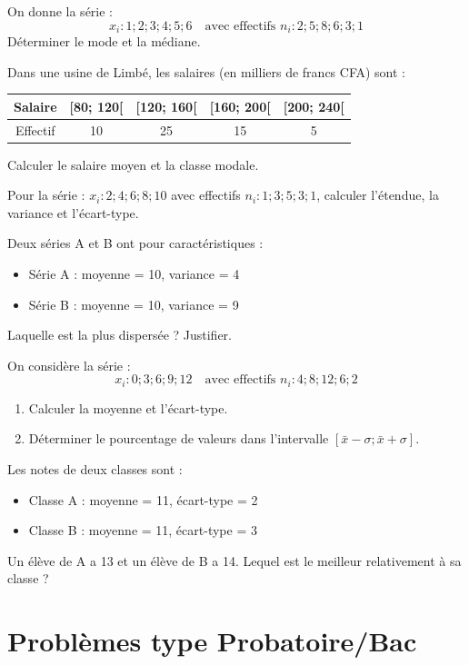 \exo{}
On donne la série :
\[
x_i : 1; 2; 3; 4; 5; 6 \quad \text{avec effectifs } n_i : 2; 5; 8; 6; 3; 1
\]
Déterminer le mode et la médiane.

\exo{}
Dans une usine de Limbé, les salaires (en milliers de francs CFA) sont :
\begin{center}
\begin{tabular}{|c|c|c|c|c|}
\hline
Salaire & [80; 120[ & [120; 160[ & [160; 200[ & [200; 240[ \\
\hline
Effectif & 10 & 25 & 15 & 5 \\
\hline
\end{tabular}
\end{center}
Calculer le salaire moyen et la classe modale.


\exo{}
Pour la série : \(x_i : 2; 4; 6; 8; 10\) avec effectifs \(n_i : 1; 3; 5; 3; 1\), calculer l'étendue, la variance et l'écart-type.

\exo{}
Deux séries A et B ont pour caractéristiques :
\begin{itemize}
\item Série A : moyenne = 10, variance = 4
\item Série B : moyenne = 10, variance = 9
\end{itemize}
Laquelle est la plus dispersée ? Justifier.

\exo{}
On considère la série :
\[
x_i : 0; 3; 6; 9; 12 \quad \text{avec effectifs } n_i : 4; 8; 12; 6; 2
\]
\begin{enumerate}[label=\alph*)]
\item Calculer la moyenne et l'écart-type.
\item Déterminer le pourcentage de valeurs dans l'intervalle \([\bar{x} - \sigma; \bar{x} + \sigma]\).
\end{enumerate}

\exo{}
Les notes de deux classes sont :
\begin{itemize}
\item Classe A : moyenne = 11, écart-type = 2
\item Classe B : moyenne = 11, écart-type = 3
\end{itemize}
Un élève de A a 13 et un élève de B a 14. Lequel est le meilleur relativement à sa classe ?

\section{Problèmes type Probatoire/Bac}

